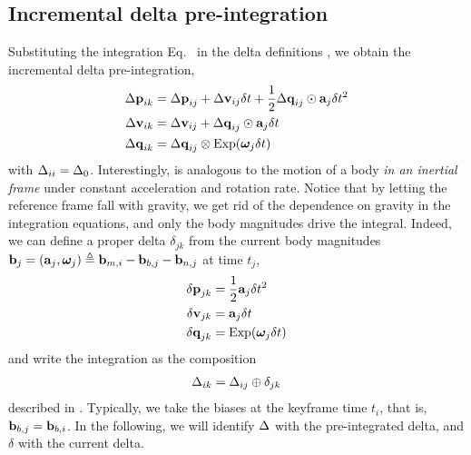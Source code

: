 \subsection{Incremental delta pre-integration}

Substituting the integration Eq.~ in the delta definitions , we obtain the incremental delta pre-integration,
%
\begin{align}\label{equ:g_second_order_pre-integration}
\begin{split}
{\Delta{\bf p}}_{ik} 
&= {\Delta{\bf p}}_{ij} + {\Delta{\bf v}}_{ij}\delta t + \frac12{\Delta{\bf q}}_{ij}\odot{\bf a}_j\delta t^2 \\
{\Delta{\bf v}}_{ik} 
&= {\Delta{\bf v}}_{ij} + {\Delta{\bf q}}_{ij}\odot{\bf a}_j\delta t \\
{\Delta{\bf q}}_{ik} 
&= {\Delta{\bf q}}_{ij}\otimes\operatorname*{Exp}({{\bm \omega}}_j\delta t) 
\end{split}
\end{align}
%
with $\Delta_{ii}=\Delta_0$.
Interestingly,  is analogous to the motion of a body \emph{in an inertial frame} under constant acceleration and rotation rate.
Notice that by letting the reference frame fall with gravity, we get rid of the dependence on gravity in the integration equations, and only the body magnitudes drive  the integral.
Indeed, we can define a proper delta $\delta_{jk}$ from the current body magnitudes ${\bf b}_j=({\bf a}_j,{{\bm \omega}}_j) \triangleq {\bf b}_{m,i} - {\bf b}_{b,j} - {\bf b}_{n,j}$ at time $t_j$,
%
\begin{align}\label{equ:delta_creation}
\begin{split}
{\delta{\bf p}}_{jk} &= \frac12{\bf a}_j\delta t^2 \\
{\delta{\bf v}}_{jk} &= {\bf a}_j\delta t \\
{\delta{\bf q}}_{jk} &= \operatorname*{Exp}({{\bm \omega}}_j\delta t)
\end{split}
\end{align}
%
and write the integration  as the composition 
%
\begin{align}\label{equ:composition_compact}
\Delta_{ik}=\Delta_{ij}\oplus\delta_{jk}
\end{align}
%
described in . 
Typically, we take the biases at the keyframe time $t_i$, that is, ${\bf b}_{b,j} = {\bf b}_{b,i}$.
In the following, we will identify $\Delta$ with the pre-integrated delta, and $\delta$ with the current delta.



